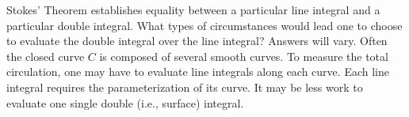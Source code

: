 {Stokes' Theorem establishes equality between a particular line integral and a particular double integral. What types of circumstances would lead one to choose to evaluate the double integral over the line integral? 
}
{Answers will vary. Often the closed curve $C$ is composed of several smooth curves. To measure the total circulation, one may have to evaluate line integrals along each curve. Each line integral requires the parameterization of its curve. It may be less work to evaluate one single double (i.e., surface) integral.
}
